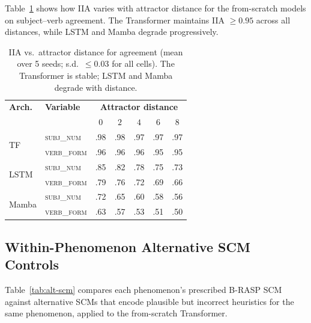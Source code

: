 \documentclass[11pt]{article}
\begin{document}
Table~\ref{tab:iia-distance} shows how IIA varies with attractor distance for the from-scratch models on subject--verb agreement.
The Transformer maintains IIA $\geq 0.95$ across all distances, while LSTM and Mamba degrade progressively.

\begin{table}[t]
\centering\small
\setlength{\tabcolsep}{2.0pt}
\begin{tabular}{@{}llccccc@{}}
\toprule
\textbf{Arch.} & \textbf{Variable} & \multicolumn{5}{c}{\textbf{Attractor distance}} \\
& & $0$ & $2$ & $4$ & $6$ & $8$ \\
\midrule
\multirow{2}{*}{TF}
 & \textsc{subj\_num}  & .98 & .98 & .97 & .97 & .97 \\
 & \textsc{verb\_form} & .96 & .96 & .96 & .95 & .95 \\[2pt]
\multirow{2}{*}{LSTM}
 & \textsc{subj\_num}  & .85 & .82 & .78 & .75 & .73 \\
 & \textsc{verb\_form} & .79 & .76 & .72 & .69 & .66 \\[2pt]
\multirow{2}{*}{Mamba}
 & \textsc{subj\_num}  & .72 & .65 & .60 & .58 & .56 \\
 & \textsc{verb\_form} & .63 & .57 & .53 & .51 & .50 \\
\bottomrule
\end{tabular}
\caption{IIA vs.\ attractor distance for agreement (mean over 5 seeds; s.d.\ $\leq 0.03$ for all cells). The Transformer is stable; LSTM and Mamba degrade with distance.}
\label{tab:iia-distance}
\end{table}

\subsection{Within-Phenomenon Alternative SCM Controls}
\label{app:alt-scm}

Table~\ref{tab:alt-scm} compares each phenomenon's prescribed B-RASP SCM against alternative SCMs that encode plausible but incorrect heuristics for the same phenomenon, applied to the from-scratch Transformer.
\end{document}
